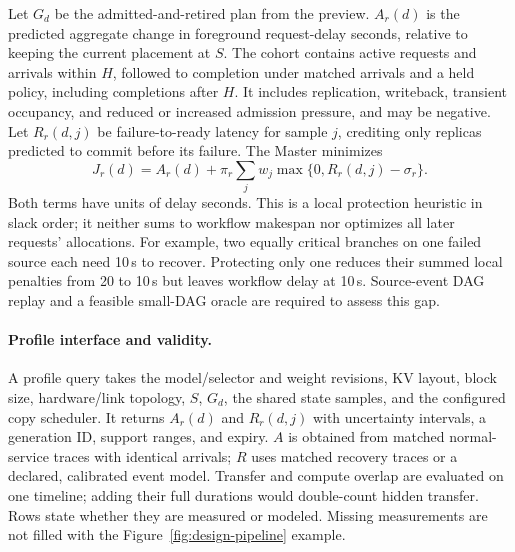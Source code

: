Let $G_d$ be the admitted-and-retired plan from the preview.
$A_r(d)$ is the predicted aggregate change in foreground request-delay
seconds, relative to keeping the current placement at $S$. The cohort
contains active requests and arrivals within $H$, followed to completion
under matched arrivals and a held policy, including completions after $H$.
It includes replication, writeback, transient occupancy, and reduced or
increased admission pressure, and may be negative. Let $R_r(d,j)$ be
failure-to-ready latency for sample $j$, crediting only replicas predicted
to commit before its failure. The Master minimizes
\begin{equation}
 J_r(d)=A_r(d)+\pi_r\sum_j w_j
          \max\{0,R_r(d,j)-\sigma_r\}.
 \label{eq:depth-score}
\end{equation}
Both terms have units of delay seconds. This is a local protection
heuristic in slack order; it neither sums to workflow makespan nor
optimizes all later requests' allocations.
For example, two equally critical branches on one failed source each
need 10\,s to recover. Protecting only one reduces their summed local
penalties from 20 to 10\,s but leaves workflow delay at 10\,s. Source-event
DAG replay and a feasible small-DAG oracle are required to assess this gap.

\paragraph{Profile interface and validity.}
A profile query takes the model/selector and weight revisions, KV layout,
block size, hardware/link topology, $S$, $G_d$, the shared state samples,
and the configured copy scheduler. It returns $A_r(d)$ and $R_r(d,j)$
with uncertainty intervals, a generation ID, support ranges, and expiry.
$A$ is obtained from matched normal-service traces with identical arrivals;
$R$ uses matched recovery traces or a declared, calibrated event model.
Transfer and compute overlap are evaluated on one timeline; adding their
full durations would double-count hidden transfer. Rows state whether
they are measured or modeled. Missing measurements are not filled with
the Figure~\ref{fig:design-pipeline} example.

